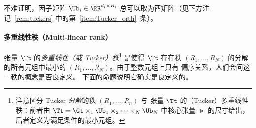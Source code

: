 不难证明，因子矩阵
$\Ub_i \in \RR^{d_i \times R_i}$ 总可以取为酉矩阵（见下方注记~\ref{rem:tuckers}
中的第~\ref{item:Tucker_orth}~条）。


\paragraph{多重线性秩（Multi-linear rank）} 张量 $\Tt$ 的\emph{多重线性（或 Tucker）秩}\footnote{注意区分 Tucker \emph{分解}的秩 $(R_1,\dots,R_n)$ 与
张量 $\Tt$ 的（Tucker）多重线性秩：前者由
$\Tt = \Gt \times_1 \Ub_1 \times_2 \dots \times_N \Ub_N$ 中核心张量 $\Gt$ 的尺寸给出，
后者定义为满足条件的最小元组。} 是使得
$\Tt$ 存在秩 $(R_1,\dots,R_N)$ 的分解的所有元组中最小的
$(R_1,\dots,R_N)$。由于整数元组上只有
偏序关系，人们会问这一秩的概念是否良定义。
下面的命题说明它确实是良定义的。

